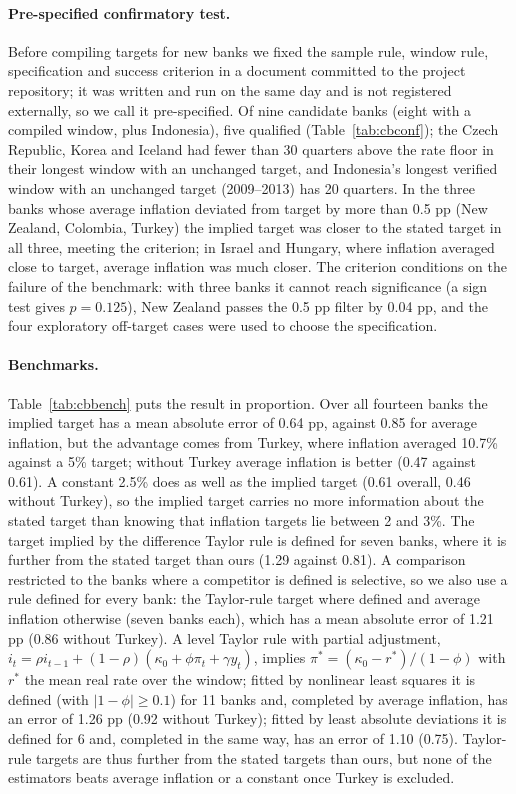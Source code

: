 \documentclass[11pt,a4paper]{article}
\theoremstyle{remark}\newtheorem{remark}{Remark}
\begin{document}
\paragraph{Pre-specified confirmatory test.} Before compiling targets for new banks we fixed the sample rule, window rule, specification and success criterion in a document committed to the project repository; it was written and run on the same day and is not registered externally, so we call it pre-specified. Of nine candidate banks (eight with a compiled window, plus Indonesia), five qualified (Table~\ref{tab:cbconf}); the Czech Republic, Korea and Iceland had fewer than 30 quarters above the rate floor in their longest window with an unchanged target, and Indonesia's longest verified window with an unchanged target (2009--2013) has 20 quarters. In the three banks whose average inflation deviated from target by more than 0.5 pp (New Zealand, Colombia, Turkey) the implied target was closer to the stated target in all three, meeting the criterion; in Israel and Hungary, where inflation averaged close to target, average inflation was much closer. The criterion conditions on the failure of the benchmark: with three banks it cannot reach significance (a sign test gives $p=0.125$), New Zealand passes the 0.5 pp filter by 0.04 pp, and the four exploratory off-target cases were used to choose the specification.

\paragraph{Benchmarks.} Table~\ref{tab:cbbench} puts the result in proportion. Over all fourteen banks the implied target has a mean absolute error of 0.64 pp, against 0.85 for average inflation, but the advantage comes from Turkey, where inflation averaged 10.7\% against a 5\% target; without Turkey average inflation is better (0.47 against 0.61). A constant 2.5\% does as well as the implied target (0.61 overall, 0.46 without Turkey), so the implied target carries no more information about the stated target than knowing that inflation targets lie between 2 and 3\%. The target implied by the difference Taylor rule is defined for seven banks, where it is further from the stated target than ours (1.29 against 0.81). A comparison restricted to the banks where a competitor is defined is selective, so we also use a rule defined for every bank: the Taylor-rule target where defined and average inflation otherwise (seven banks each), which has a mean absolute error of 1.21 pp (0.86 without Turkey). A level Taylor rule with partial adjustment, $i_t=\rho i_{t-1}+(1-\rho)(\kappa_0+\phi\pi_t+\gamma y_t)$, implies $\pi^*=(\kappa_0-r^*)/(1-\phi)$ with $r^*$ the mean real rate over the window; fitted by nonlinear least squares it is defined (with $|1-\phi|\ge0.1$) for 11 banks and, completed by average inflation, has an error of 1.26 pp (0.92 without Turkey); fitted by least absolute deviations it is defined for 6 and, completed in the same way, has an error of 1.10 (0.75). Taylor-rule targets are thus further from the stated targets than ours, but none of the estimators beats average inflation or a constant once Turkey is excluded.
\end{document}
